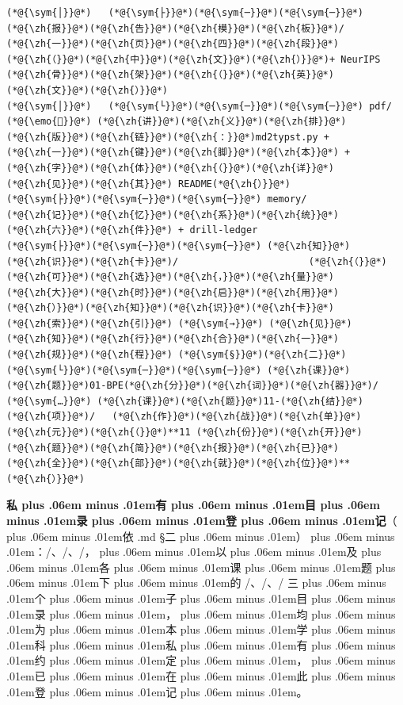 \documentclass[
]{article}
\newcommand{\passthrough}[1]{#1}
\def\zh#1{{\zhfont #1}}
\def\sym#1{{\symfont #1}}
\def\emo#1{{\emofont #1}}
\def\codezh#1{{\zhmonofont #1}}
\def\zhglue{\hskip0pt plus .06em minus .01em}
\begin{document}
\begin{lstlisting}
(*@{\sym{│}}@*)   (*@{\sym{├}}@*)(*@{\sym{─}}@*)(*@{\sym{─}}@*) (*@{\zh{报}}@*)(*@{\zh{告}}@*)(*@{\zh{模}}@*)(*@{\zh{板}}@*)/                 (*@{\zh{一}}@*)(*@{\zh{页}}@*)(*@{\zh{四}}@*)(*@{\zh{段}}@*)(*@{\zh{（}}@*)(*@{\zh{中}}@*)(*@{\zh{文}}@*)(*@{\zh{）}}@*)+ NeurIPS (*@{\zh{骨}}@*)(*@{\zh{架}}@*)(*@{\zh{（}}@*)(*@{\zh{英}}@*)(*@{\zh{文}}@*)(*@{\zh{）}}@*)
(*@{\sym{│}}@*)   (*@{\sym{└}}@*)(*@{\sym{─}}@*)(*@{\sym{─}}@*) pdf/                      (*@{\emo{📕}}@*) (*@{\zh{讲}}@*)(*@{\zh{义}}@*)(*@{\zh{排}}@*)(*@{\zh{版}}@*)(*@{\zh{链}}@*)(*@{\zh{：}}@*)md2typst.py + (*@{\zh{一}}@*)(*@{\zh{键}}@*)(*@{\zh{脚}}@*)(*@{\zh{本}}@*) + (*@{\zh{字}}@*)(*@{\zh{体}}@*)(*@{\zh{（}}@*)(*@{\zh{详}}@*)(*@{\zh{见}}@*)(*@{\zh{其}}@*) README(*@{\zh{）}}@*)
(*@{\sym{├}}@*)(*@{\sym{─}}@*)(*@{\sym{─}}@*) memory/                      (*@{\zh{记}}@*)(*@{\zh{忆}}@*)(*@{\zh{系}}@*)(*@{\zh{统}}@*)(*@{\zh{六}}@*)(*@{\zh{件}}@*) + drill-ledger
(*@{\sym{├}}@*)(*@{\sym{─}}@*)(*@{\sym{─}}@*) (*@{\zh{知}}@*)(*@{\zh{识}}@*)(*@{\zh{卡}}@*)/                       (*@{\zh{（}}@*)(*@{\zh{可}}@*)(*@{\zh{选}}@*)(*@{\zh{，}}@*)(*@{\zh{量}}@*)(*@{\zh{大}}@*)(*@{\zh{时}}@*)(*@{\zh{启}}@*)(*@{\zh{用}}@*)(*@{\zh{）}}@*)(*@{\zh{知}}@*)(*@{\zh{识}}@*)(*@{\zh{卡}}@*)(*@{\zh{索}}@*)(*@{\zh{引}}@*) (*@{\sym{→}}@*) (*@{\zh{见}}@*)(*@{\zh{知}}@*)(*@{\zh{行}}@*)(*@{\zh{合}}@*)(*@{\zh{一}}@*)(*@{\zh{规}}@*)(*@{\zh{程}}@*) (*@{\sym{§}}@*)(*@{\zh{二}}@*)
(*@{\sym{└}}@*)(*@{\sym{─}}@*)(*@{\sym{─}}@*) (*@{\zh{课}}@*)(*@{\zh{题}}@*)01-BPE(*@{\zh{分}}@*)(*@{\zh{词}}@*)(*@{\zh{器}}@*)/ (*@{\sym{…}}@*) (*@{\zh{课}}@*)(*@{\zh{题}}@*)11-(*@{\zh{结}}@*)(*@{\zh{项}}@*)/   (*@{\zh{作}}@*)(*@{\zh{战}}@*)(*@{\zh{单}}@*)(*@{\zh{元}}@*)(*@{\zh{（}}@*)**11 (*@{\zh{份}}@*)(*@{\zh{开}}@*)(*@{\zh{题}}@*)(*@{\zh{简}}@*)(*@{\zh{报}}@*)(*@{\zh{已}}@*)(*@{\zh{全}}@*)(*@{\zh{部}}@*)(*@{\zh{就}}@*)(*@{\zh{位}}@*)**(*@{\zh{）}}@*)
\end{lstlisting}

\textbf{\zh{私\zhglue 有\zhglue 目\zhglue 录\zhglue 登\zhglue 记}}\zh{（\zhglue 依} \passthrough{\codezh{{\zh{仓}}{\zh{库}}{\zh{使}}{\zh{用}}{\zh{手}}{\zh{册}}.md}} \sym{§}\zh{二\zhglue ）\zhglue ：}\passthrough{\codezh{{\zh{课}}{\zh{程}}{\zh{轨}}/}}\zh{、}\passthrough{\codezh{{\zh{环}}{\zh{境}}/}}\zh{、}\passthrough{\codezh{{\zh{知}}{\zh{识}}{\zh{卡}}/}}\zh{，\zhglue 以\zhglue 及\zhglue 各\zhglue 课\zhglue 题\zhglue 下\zhglue 的} \passthrough{\codezh{{\zh{手}}{\zh{写}}/}}\zh{、}\passthrough{\codezh{{\zh{脚}}{\zh{手}}{\zh{架}}/}}\zh{、}\passthrough{\codezh{{\zh{证}}{\zh{据}}/}} \zh{三\zhglue 个\zhglue 子\zhglue 目\zhglue 录\zhglue ，\zhglue 均\zhglue 为\zhglue 本\zhglue 学\zhglue 科\zhglue 私\zhglue 有\zhglue 约\zhglue 定\zhglue ，\zhglue 已\zhglue 在\zhglue 此\zhglue 登\zhglue 记\zhglue 。}
\end{document}
